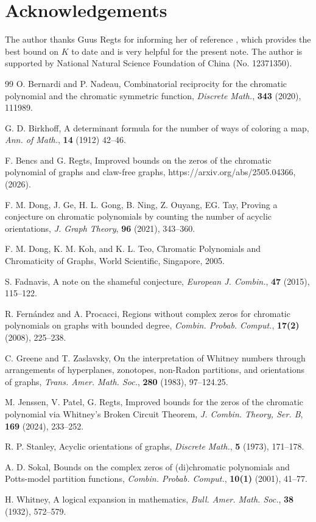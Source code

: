 \documentclass[12pt]{article}
\theoremstyle{definition}
\begin{document}
\section*{Acknowledgements}

The author thanks Guus Regts for informing her of reference \cite{BR26}, which provides the best bound on $K$ to date and is very helpful for the present note.
The author is supported by National Natural Science Foundation of China (No. 12371350).

\begin{thebibliography}{99}
\frenchspacing
{} O. Bernardi and P. Nadeau, Combinatorial reciprocity for the chromatic polynomial and the chromatic
symmetric function, \emph{Discrete Math.}, \textbf{343} (2020), 111989.

 G. D. Birkhoff, A determinant formula for the number of ways of coloring a map, \emph{Ann. of Math.}, {\bf14}
(1912) 42--46.

 F. Bencs and G. Regts, Improved bounds on the zeros of the chromatic polynomial of graphs and claw-free graphs,
https://arxiv.org/abs/2505.04366, (2026).


  F. M. Dong,  J. Ge,  H. L. Gong,  B. Ning,  Z. Ouyang,  EG. Tay,  Proving a
conjecture on chromatic polynomials by counting the number of acyclic orientations,
\emph{J. Graph Theory}, \textbf{96} (2021), 343--360.

 F. M. Dong, K. M. Koh, and K. L. Teo, Chromatic Polynomials and Chromaticity of Graphs, World
Scientific, Singapore, 2005.

 S. Fadnavis, A note on the shameful conjecture, \emph{European J. Combin.}, \textbf{47} (2015), 115--122.

 R. Fern\'{a}ndez and A. Procacci, Regions without complex zeros for chromatic polynomials
on graphs with bounded degree, \emph{Combin. Probab. Comput.}, \textbf{17(2)} (2008), 225--238.


C. Greene and T. Zaslavsky, On the interpretation of Whitney numbers through arrangements of hyperplanes,
zonotopes, non-Radon partitions, and orientations of graphs, \emph{Trans. Amer. Math. Soc.}, \textbf{280} (1983), 97--124.25.

M. Jenssen, V. Patel, G. Regts, Improved bounds for the zeros of the chromatic polynomial via Whitney's Broken Circuit Theorem, \emph{J. Combin. Theory, Ser. B}, \textbf{169} (2024), 233--252.

R. P. Stanley, Acyclic orientations of graphs, \emph{Discrete Math.}, \textbf{5} (1973), 171--178.

A. D. Sokal, Bounds on the complex zeros of (di)chromatic polynomials and Potts-model partition
functions, \emph{Combin. Probab. Comput.}, \textbf{10(1)} (2001), 41--77.


 H. Whitney, A logical expansion in mathematics, \emph{Bull. Amer. Math. Soc.}, \textbf{38} (1932), 572--579.


\end{thebibliography}
%
\end{document}
